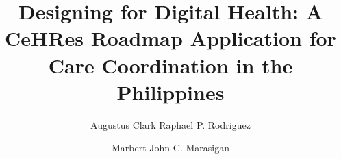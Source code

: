 \documentclass[manuscript, screen, review]{acmart}
\begin{document}
\title[CeHRes Roadmap for Care Coordination in the Philippines]{Designing for Digital Health: 
A CeHRes Roadmap Application for Care Coordination in the Philippines}

\author{Augustus Clark Raphael P. Rodriguez}

\author{Marbert John C. Marasigan}

\renewcommand{\shortauthors}{Rodriguez and Marasigan}

\begin{abstract}
\end{abstract}
\end{document}
